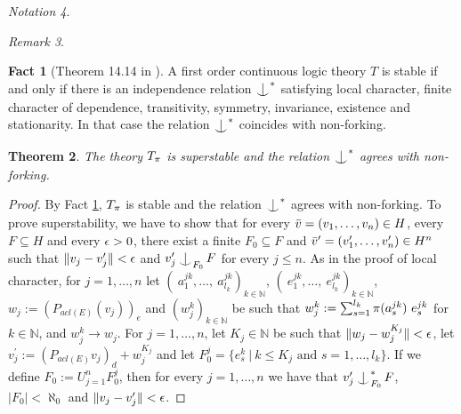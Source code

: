 \documentclass{amsart}
\def\bth{\begin{theo}}\def\eth{\end{theo}}
\def\bfc{\begin{fact}}\def\efc{\end{fact}}
\def\brm{\begin{rem}}\def\erm{\end{rem}}
\def\blm{\begin{lemma}}\def\elm{\end{lemma}}
\def\bpf{\begin{proof}}\def\epf{\end{proof}}
\newtheorem{theo}{Theorem}[section]
\newtheorem{lemma}[theo]{Lemma}
\theoremstyle{definition}
\newtheorem{fact}[theo]{Fact}
\theoremstyle{remark}
\newtheorem{rem}[theo]{Remark}
\newtheorem{nota}[theo]{Notation}
\newcommand{\N}{\ensuremath{\mathbb{N}}}
\begin{document}
\begin{nota}
\begin{rem}
\bfc[Theorem 14.14 in \cite{BBHU}]\label{LemmaTstableIffItHasGoodIndependenceRelation}
A first order continuous logic theory $T$ is stable if and only if there is an independence relation $\ind^*$ satisfying local character, finite character of dependence, transitivity, symmetry, invariance, existence and stationarity. In that case the relation $\ind^*$ coincides with non-forking.
\efc


\bth\label{Tpisuperstable}
The theory $T_\pi$ is superstable and the relation $\ind^*$ agrees with non-forking.
\eth
\bpf
By Fact \ref{LemmaTstableIffItHasGoodIndependenceRelation}, $T_\pi$ is stable and the relation $\ind^*$ agrees with non-forking. To prove superstability, we have to show that for every $\bar v=(v_1,\dots,v_n)\in H$, every $F\subseteq H$ and every $\epsilon>0$, there exist a finite $F_0\subseteq F$ and $\bar v^\prime=(v_1^\prime,\dots,v_n^\prime)\in H^n$ such that $\|v_j-v_j^\prime\|<\epsilon$ and $v_j^\prime\ind_{F_0}F$ for every $j\leq n$. As in the proof of local character, for $j=1,\dots,n$ let $(\ a_1^{jk},\dots,\ a_{l_k}^{jk})_{k\in\N}$, $(\ e_1^{jk},\dots,\ e_{l_k}^{jk})_{k\in\N}$, $w_j:=(P_{acl(E)}(v_j))_e$ and $(w_j^k)_{k\in\N}$ be such that $w_j^k:=\sum_{s=1}^{l_k}\p(a_s^{jk})\ e_s^{jk}$ for $k\in\N$, and $w_j^k\to w_j$. For $j=1,\dots,n$, let $K_j\in\N$ be such that $\|w_j-w_j^{K_j}\|<\epsilon$, let $v_j^\prime:=(P_{acl(E)}v_j)_d+w_j^{K_j}$ and let $F_0^j=\{e_s^k\ |\ k\leq K_j\text{ and }s=1,\dots,l_k\}$. If we define $F_0:=U_{j=1}^nF_0^j$, then for every $j=1,\dots,n$ we have that $v_j^\prime\ind_{F_0}^*F$, $|F_0|<\aleph_0$ and $\|v_j-v_j^\prime\|<\epsilon$.
\epf



\end{rem}
\end{nota}
\end{document}
